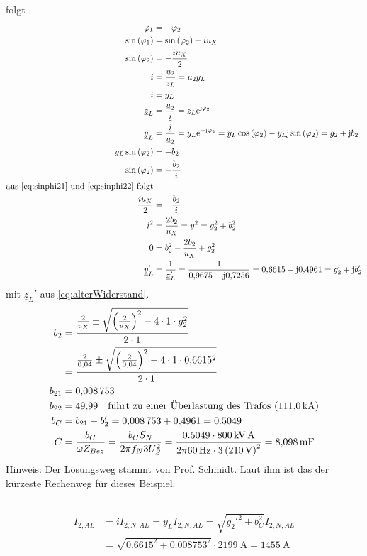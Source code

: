 \documentclass[11pt,a4paper]{scrartcl}
\newcommand{\mybr}[1]{\left(#1\right)}
\renewcommand{\j}{\mathrm{j}}
\newcommand{\z}{\underline{z}}
\newcommand{\y}{\underline{y}}
\renewcommand{\u}{\underline{u}}
\renewcommand{\i}{\underline{i}}
\newcommand{\0}{_{\mybr{0}}}
\newcommand{\1}{_{\mybr{1}}}
\newcommand{\2}{_{\mybr{2}}}
\newcommand{\ISA}{I_{2,AL}}
\newcommand{\ISNA}{I_{2,N,AL}}
\newcommand{\se}{\sin\mybr{\varphi_1}}
\newcommand{\cz}{\cos\mybr{\varphi_2}}
\newcommand{\sz}{\sin\mybr{\varphi_2}}
\renewcommand{\e}{\mathrm{e}}
\begin{document}
folgt
\begin{align}
\varphi_1&=-\varphi_2\\
\se&=\sz+i u_X\\
\sz&=-\frac{i u_X}{2}\label{eq:sinphi21}\\
i&=\frac{u_2}{z_L}=u_2 y_L\\
i&=y_L\\
\z_L&=\frac{\u_2}{\i}=z_L\e^{\j\varphi_2}\\
\y_L&=\frac{\i}{\u_2}=y_L\e^{-\j\varphi_2}=y_L\cz-y_L\j\sz=g_2+\j b_2\\
y_L\sz&=-b_2\\
\sz&=-\frac{b_2}{i}\label{eq:sinphi22}\\
\text{aus \eqref{eq:sinphi21} und \eqref{eq:sinphi22} folgt}\nonumber\\
-\frac{i u_X}{2}&=-\frac{b_2}{i}\\
i^2&=\frac{2 b_2}{u_X}=y^2=g_2^2+b_2^2\\
0&=b_2^2-\frac{2 b_2}{u_X}+g_2^2\\
\y_L'&=\frac{1}{\z_L'}=\frac{1}{\num{0.9675}+\j\num{0.7256}}=\num{0.6615}-\j\num{0.4961}=g_2'+\j b_2'\\
\end{align}
mit $\z_L'$ aus \eqref{eq:alterWiderstand}. 
\begin{align}
b_2&=\frac{\frac{2}{u_X}\pm\sqrt{\mybr{\frac{2}{u_X}}^2-4\cdot 1\cdot g_2^2}}{2\cdot1}\\
&=\frac{\frac{2}{\num{0.04}}\pm\sqrt{\mybr{\frac{2}{\num{0.04}}}^2-4\cdot 1\cdot \num{0.6615}^2}}{2\cdot1}\\
b_{21}&=\num{0.008753}\\
b_{22}&=\num{49.99}\quad \text{führt zu einer Überlastung des Trafos (\SI{111,0}{\kilo\ampere})}\\
b_C&=b_{21}-b_2'= \num{0.008753}+\num{0.4961} = 0.5049\\
C&=\frac{b_C}{\omega Z_{Bez}}=\frac{b_C S_N}{2\pi f_N 3 U_S^2}=\frac{0.5049\cdot\SI{800}{\kilo\volt\ampere}}{2\pi\SI{60}{\hertz}\cdot 3\mybr{\SI{210}{\volt}}^2}=\SI{8.098}{\milli\farad}
\end{align}
Hinweis: Der Lösungsweg stammt von Prof. Schmidt. Laut ihm ist das der kürzeste Rechenweg für dieses Beispiel.

\subsection{}
\begin{align}
\ISA&=i\ISNA=y_L\ISNA=\sqrt{g_2'^2+b_C^2}\ISNA\\
&=\sqrt{\num{0.6615}^2+\num{0.008753}^2}\cdot\SI{2199}{\ampere}=\SI{1455}{\ampere}
\end{align}
\end{document}
